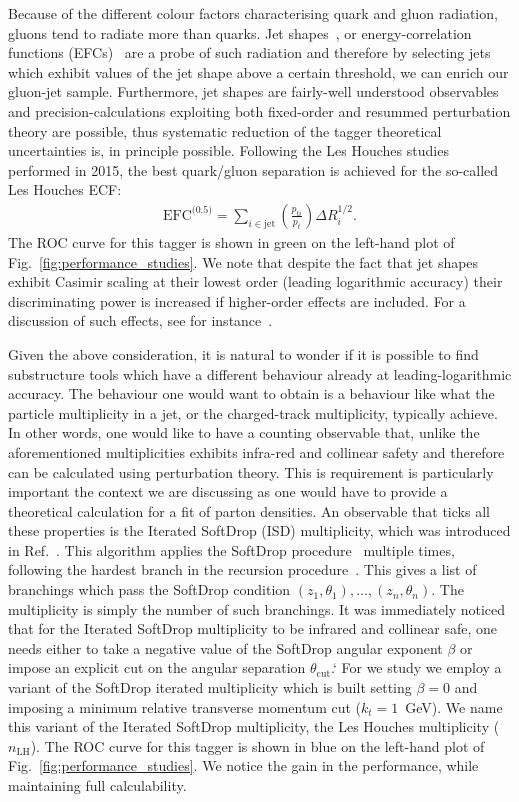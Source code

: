 Because of the different colour factors characterising quark and gluon radiation, gluons tend to radiate more than quarks. Jet shapes~\cite{}, or energy-correlation functions (EFCs)~\cite{} are a probe of such radiation and therefore by selecting jets which exhibit values of the jet shape above a certain threshold, we can enrich our gluon-jet sample. 
% 
Furthermore, jet shapes are fairly-well understood observables and precision-calculations exploiting both fixed-order and resummed perturbation theory are possible, thus systematic reduction of the tagger theoretical uncertainties is, in principle possible. Following the Les Houches studies performed in 2015, the best quark/gluon separation is achieved for the so-called Les Houches ECF:  
\begin{align}\label{LH-EFC}
\text{EFC}^\text{(0.5)}=\sum_{i \in \text{jet}} \left(\frac{p_{ti}}{p_t} \right) \Delta R_i^{1/2}.
\end{align}
The ROC curve for this tagger is shown in green on the left-hand plot of  Fig.~\ref{fig:performance_studies}. We note that despite the fact that jet shapes exhibit Casimir scaling at their lowest order (leading logarithmic accuracy) their discriminating power is increased if higher-order effects are included. For a discussion of such effects, see for instance~\cite{}.

Given the above consideration, it is natural to wonder if it is possible to find substructure tools
which have a different behaviour already at leading-logarithmic
accuracy.
%
The behaviour one would want to obtain is a behaviour like what the particle multiplicity in a jet, or the charged-track multiplicity, typically achieve. In other words, one would like to have a counting observable that, unlike the aforementioned multiplicities exhibits infra-red and collinear safety and therefore can be calculated using perturbation theory. This is requirement is particularly important the context we are discussing as one would have to provide a theoretical calculation for a fit of parton densities. 
%
An observable that ticks all these properties is the Iterated SoftDrop (ISD) multiplicity, which was introduced in Ref.~\cite{}.
%
This algorithm applies the SoftDrop procedure~\cite{} multiple
times, following the hardest branch in
the recursion procedure~\cite{Frye:2017yrw}. This gives a list of
branchings which pass the SoftDrop condition
$(z_1,\theta_1), \dots, (z_n,\theta_n)$. The multiplicity is simply the number of such branchings.
%
It was immediately noticed that for the Iterated SoftDrop multiplicity to be infrared
and collinear safe, one needs either to take a negative value of the SoftDrop angular exponent $\beta$ or impose an explicit cut on the angular separation  $\theta_\text{cut}$.`
%
For we study we employ a variant of the SoftDrop iterated multiplicity which is built setting $\beta=0$ and imposing a minimum relative transverse momentum cut ($k_t=1$~GeV). We name this variant of the Iterated SoftDrop multiplicity, the Les Houches multiplicity ($n_\text{LH}$).
The ROC curve for this tagger is shown in blue on the left-hand plot of  Fig.~\ref{fig:performance_studies}. We notice the gain in the performance, while maintaining full calculability. 

